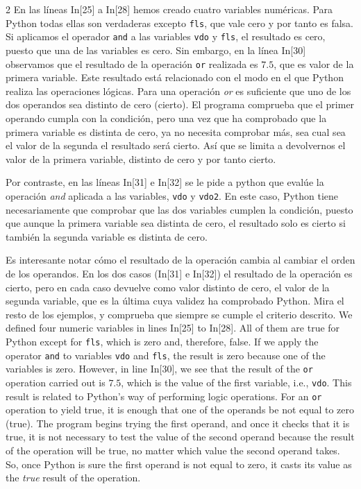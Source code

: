 \begin{paracol}{2}
En las líneas In[25] a In[28] hemos creado cuatro variables numéricas. Para Python todas ellas son verdaderas excepto \texttt{fls}, que vale cero y por tanto es falsa. Si aplicamos el operador \texttt{and} a las variables \texttt{vdo} y \texttt{fls}, el resultado es cero, puesto que una de las variables es cero. Sin embargo, en la línea In[30] observamos que el resultado de la operación \texttt{or} realizada es $7.5$, que es valor de la primera variable. Este resultado está relacionado con el modo en el que Python realiza las operaciones lógicas. Para una operación \emph{or} es suficiente que uno de los dos operandos sea distinto de cero (cierto). El programa comprueba que el primer operando cumpla con la condición, pero una vez que ha comprobado que la primera variable es distinta de cero, ya no necesita comprobar más, sea cual sea el valor de la segunda el resultado será cierto. Así que se limita a devolvernos el valor de la primera variable, distinto de cero y por tanto cierto.

Por contraste, en las líneas In[31] e In[32] se le pide a python que evalúe la operación \emph{and} aplicada a las variables, \texttt{vdo} y \texttt{vdo2}. En este caso, Python tiene necesariamente que comprobar que las dos variables cumplen la condición, puesto que aunque la primera variable sea distinta de cero, el resultado solo es cierto si también la segunda variable es distinta de cero. 

Es interesante notar cómo el resultado de la operación cambia al cambiar el orden de los operandos. En los dos casos (In[31] e In[32]) el resultado de la operación es cierto, pero en cada caso devuelve como valor distinto de cero, el valor de la segunda variable, que es la última cuya validez ha comprobado Python. Mira el resto de los ejemplos, y comprueba que siempre se cumple el criterio descrito.
\switchcolumn
We defined four numeric variables in lines In[25] to In[28]. All of them are true for Python except for \texttt{fls}, which is zero and, therefore, false. If we apply the operator \texttt{and} to variables \texttt{vdo} and \texttt{fls}, the result is zero because one of the variables is zero. However, in line In[30], we see that the result of the \texttt{or} operation carried out is $7.5$, which is the value of the first variable, i.e., \texttt{vdo}. This result is related to Python's way of performing logic operations. For an  \texttt{or} operation to yield true, it is enough that one of the operands be not equal to zero (true). The program begins trying the first operand, and once it checks that it is true, it is not necessary to test the value of the second operand because the result of the operation will be true, no matter which value the second operand takes. So, once Python is sure the first operand is not equal to zero, it casts its value as the \emph{true} result of the operation.


\end{paracol}
